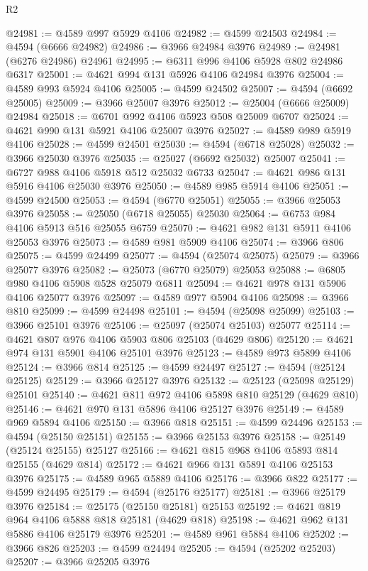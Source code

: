 \begin{lexlean}{R2}
\begin{coremodule}
@24981 := @4589 @997 @5929 @4106
@24982 := @4599 @24503
@24984 := @4594 (@6666 @24982)
@24986 := @3966 @24984 @3976
@24989 := @24981 (@6276 @24986) @24961
@24995 := @6311 @996 @4106 @5928 @802 @24986 @6317
@25001 := @4621 @994 @131 @5926 @4106 @24984 @3976
@25004 := @4589 @993 @5924 @4106
@25005 := @4599 @24502
@25007 := @4594 (@6692 @25005)
@25009 := @3966 @25007 @3976
@25012 := @25004 (@6666 @25009) @24984
@25018 := @6701 @992 @4106 @5923 @508 @25009 @6707
@25024 := @4621 @990 @131 @5921 @4106 @25007 @3976
@25027 := @4589 @989 @5919 @4106
@25028 := @4599 @24501
@25030 := @4594 (@6718 @25028)
@25032 := @3966 @25030 @3976
@25035 := @25027 (@6692 @25032) @25007
@25041 := @6727 @988 @4106 @5918 @512 @25032 @6733
@25047 := @4621 @986 @131 @5916 @4106 @25030 @3976
@25050 := @4589 @985 @5914 @4106
@25051 := @4599 @24500
@25053 := @4594 (@6770 @25051)
@25055 := @3966 @25053 @3976
@25058 := @25050 (@6718 @25055) @25030
@25064 := @6753 @984 @4106 @5913 @516 @25055 @6759
@25070 := @4621 @982 @131 @5911 @4106 @25053 @3976
@25073 := @4589 @981 @5909 @4106
@25074 := @3966 @806
@25075 := @4599 @24499
@25077 := @4594 (@25074 @25075)
@25079 := @3966 @25077 @3976
@25082 := @25073 (@6770 @25079) @25053
@25088 := @6805 @980 @4106 @5908 @528 @25079 @6811
@25094 := @4621 @978 @131 @5906 @4106 @25077 @3976
@25097 := @4589 @977 @5904 @4106
@25098 := @3966 @810
@25099 := @4599 @24498
@25101 := @4594 (@25098 @25099)
@25103 := @3966 @25101 @3976
@25106 := @25097 (@25074 @25103) @25077
@25114 := @4621 @807 @976 @4106 @5903 @806 @25103 (@4629 @806)
@25120 := @4621 @974 @131 @5901 @4106 @25101 @3976
@25123 := @4589 @973 @5899 @4106
@25124 := @3966 @814
@25125 := @4599 @24497
@25127 := @4594 (@25124 @25125)
@25129 := @3966 @25127 @3976
@25132 := @25123 (@25098 @25129) @25101
@25140 := @4621 @811 @972 @4106 @5898 @810 @25129 (@4629 @810)
@25146 := @4621 @970 @131 @5896 @4106 @25127 @3976
@25149 := @4589 @969 @5894 @4106
@25150 := @3966 @818
@25151 := @4599 @24496
@25153 := @4594 (@25150 @25151)
@25155 := @3966 @25153 @3976
@25158 := @25149 (@25124 @25155) @25127
@25166 := @4621 @815 @968 @4106 @5893 @814 @25155 (@4629 @814)
@25172 := @4621 @966 @131 @5891 @4106 @25153 @3976
@25175 := @4589 @965 @5889 @4106
@25176 := @3966 @822
@25177 := @4599 @24495
@25179 := @4594 (@25176 @25177)
@25181 := @3966 @25179 @3976
@25184 := @25175 (@25150 @25181) @25153
@25192 := @4621 @819 @964 @4106 @5888 @818 @25181 (@4629 @818)
@25198 := @4621 @962 @131 @5886 @4106 @25179 @3976
@25201 := @4589 @961 @5884 @4106
@25202 := @3966 @826
@25203 := @4599 @24494
@25205 := @4594 (@25202 @25203)
@25207 := @3966 @25205 @3976

\end{coremodule}
\end{lexlean}
